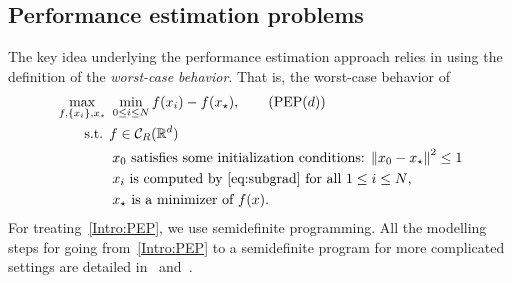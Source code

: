 \documentclass[11pt,a4paper]{article}
\newcommand{\normsq}[1]{{\left\lVert#1\right\rVert}^2}
\newcommand{\Rd}{\mathbb{R}^d}
\begin{document}
	\subsection{Performance estimation problems}
	The key idea underlying the performance estimation approach relies in using the definition of the \emph{worst-case behavior}. That is, the worst-case behavior of
	\begin{align}
	&\max_{f,\{x_i\},x_\star} \ \min_{0\leq i\leq N} f(x_i)-f(x_\star),  \tag{PEP$(d)$}\label{Intro:PEP} \\
	&\quad\quad \text{s.t. } f\in \mathcal{C}_R(\Rd)  \notag\\
	&\quad\quad\quad\quad    x_0 \text{ satisfies some initialization conditions: } \normsq{x_0-x_\star}\leq 1\notag \\
	&\quad\quad\quad\quad    x_{i} \text{ is computed by~\eqref{eq:subgrad} for all $1 \le i \le N$,}
	\notag\\
	&\quad\quad\quad\quad    x_\star \text{ is a minimizer of } f(x). \notag
	\end{align}
	For treating~\eqref{Intro:PEP}, we use semidefinite programming. All the modelling steps for going from~\eqref{Intro:PEP} to a semidefinite program for more complicated settings are detailed in~\cite{taylor2015smooth} and~\cite{taylor2015exact}.
\end{document}
